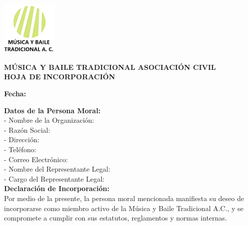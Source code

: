 \documentclass[a4paper,12pt]{article}
\begin{document}
\begin{center}
    \includegraphics[width=0.2\textwidth]{logo.png} %
\end{center}

\begin{center}
    \textbf{MÚSICA Y BAILE TRADICIONAL ASOCIACIÓN CIVIL} \\[0.5cm]
    \textbf{HOJA DE INCORPORACIÓN}
\end{center}

\vspace{0.5cm}

\begin{flushright}
    \textbf{Fecha:} \underline{\hspace{6cm}} %
\end{flushright}

\vspace{0.5cm}

\noindent
\textbf{Datos de la Persona Moral:} \\[0.2cm]
- Nombre de la Organización: \underline{\hspace{10cm}} \\[0.2cm]
- Razón Social: \underline{\hspace{10cm}} \\[0.2cm]
- Dirección: \underline{\hspace{10cm}} \\[0.2cm]
- Teléfono: \underline{\hspace{10cm}} \\[0.2cm]
- Correo Electrónico: \underline{\hspace{10cm}} \\[0.2cm]
- Nombre del Representante Legal: \underline{\hspace{10cm}} \\[0.2cm]
- Cargo del Representante Legal: \underline{\hspace{10cm}} \\[0.5cm]

\noindent
\textbf{Declaración de Incorporación:} \\[0.2cm]
Por medio de la presente, la persona moral mencionada manifiesta su deseo de incorporarse como miembro activo de la  Música y Baile Tradicional A.C., y se compromete a cumplir con sus estatutos, reglamentos y normas internas.
\end{document}
